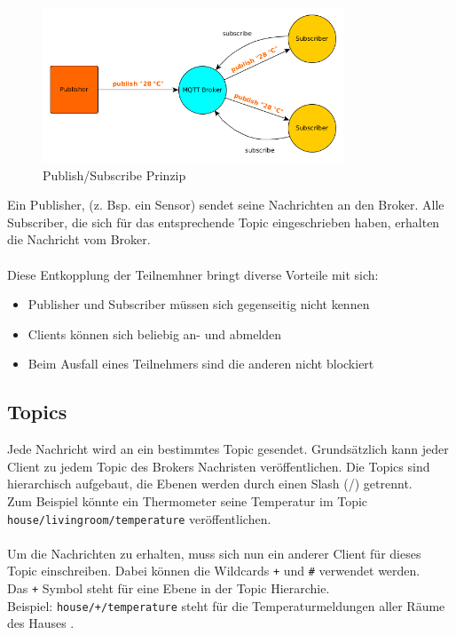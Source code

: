 \begin{figure}[H]
	\centering
		\includegraphics[width=0.8\textwidth]{diag/pub_sub.png}
	\caption{\label{fig:pub_sub}Publish/Subscribe Prinzip}
\end{figure}


\par
Ein Publisher, (z. Bsp. ein Sensor) sendet seine Nachrichten an den Broker. Alle Subscriber, die sich für das entsprechende Topic eingeschrieben haben, erhalten die Nachricht vom Broker. 
\\ \\
Diese Entkopplung der Teilnemhner bringt diverse Vorteile mit sich:

\begin{itemize}
\item Publisher und Subscriber müssen sich gegenseitig nicht kennen
\item Clients können sich beliebig an- und abmelden
\item Beim Ausfall eines Teilnehmers sind die anderen nicht blockiert
\end{itemize}

\subsection{Topics}
Jede Nachricht wird an ein bestimmtes Topic gesendet. Grundsätzlich kann jeder Client zu jedem Topic des Brokers Nachristen veröffentlichen. Die Topics sind hierarchisch aufgebaut, die Ebenen werden durch einen Slash (/) getrennt.\\
Zum Beispiel könnte ein Thermometer seine Temperatur im Topic \texttt{house/livingroom/temperature} veröffentlichen.\\ \\
Um die Nachrichten zu erhalten, muss sich nun ein anderer Client für dieses Topic einschreiben. Dabei können die Wildcards \texttt{+} und \texttt{\#} verwendet werden.\\
Das \texttt{+} Symbol steht für eine Ebene in der Topic Hierarchie.\\
Beispiel: \texttt{house/+/temperature} steht für die Temperaturmeldungen aller Räume des Hauses .

